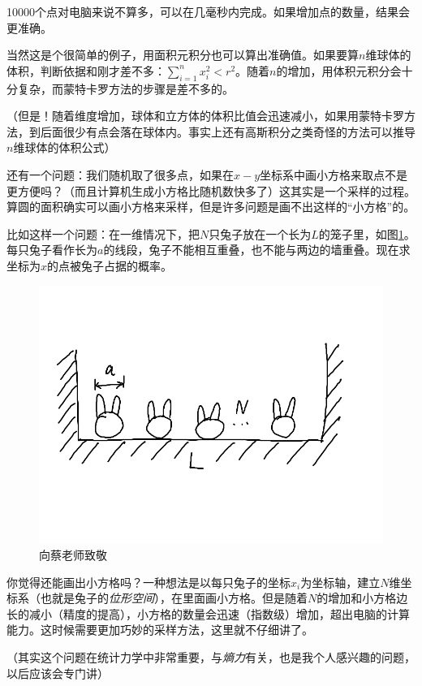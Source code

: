10000个点对电脑来说不算多，可以在几毫秒内完成。如果增加点的数量，结果会更准确。

当然这是个很简单的例子，用面积元积分也可以算出准确值。如果要算$n$维球体的体积，判断依据和刚才差不多：$\sum_{i=1}^n x_i^2<r^2$。随着$n$的增加，用体积元积分会十分复杂，而蒙特卡罗方法的步骤是差不多的。

（但是！随着维度增加，球体和立方体的体积比值会迅速减小，如果用蒙特卡罗方法，到后面很少有点会落在球体内。事实上还有高斯积分之类奇怪的方法可以推导$n$维球体的体积公式）

还有一个问题：我们随机取了很多点，如果在$x-y$坐标系中画小方格来取点不是更方便吗？（而且计算机生成小方格比随机数快多了）这其实是一个采样的过程。算圆的面积确实可以画小方格来采样，但是许多问题是画不出这样的“小方格”的。

比如这样一个问题：在一维情况下，把$N$只兔子放在一个长为$L$的笼子里，如图\ref{fig-rabbit-box}。每只兔子看作长为$a$的线段，兔子不能相互重叠，也不能与两边的墙重叠。现在求坐标为$x$的点被兔子占据的概率。
\begin{figure}[htb]
\centering
\includegraphics[scale=0.5]{fig/rabbit-box.png}
\caption{向蔡老师致敬}
\label{fig-rabbit-box}
\end{figure}

你觉得还能画出小方格吗？一种想法是以每只兔子的坐标$x_i$为坐标轴，建立$N$维坐标系（也就是兔子的\emph{位形空间}），在里面画小方格。但是随着$N$的增加和小方格边长的减小（精度的提高），小方格的数量会迅速（指数级）增加，超出电脑的计算能力。这时候需要更加巧妙的采样方法，这里就不仔细讲了。

（其实这个问题在统计力学中非常重要，与\emph{熵力}有关，也是我个人感兴趣的问题，以后应该会专门讲）

